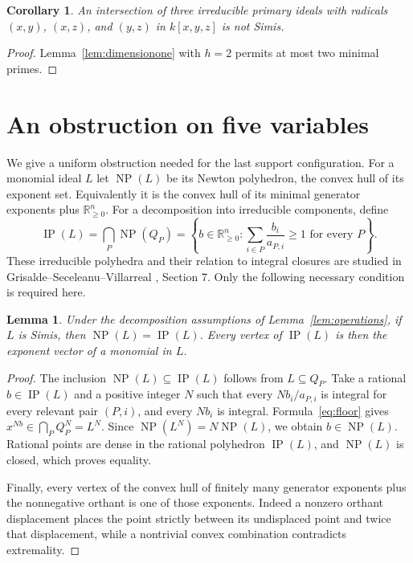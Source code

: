 \documentclass[11pt]{article}
\newtheorem{lemma}[theorem]{Lemma}
\newtheorem{corollary}[theorem]{Corollary}
\newcommand{\NP}{\operatorname{NP}}
\newcommand{\IP}{\operatorname{IP}}
\newcommand{\R}{\mathbb R}
\begin{document}
\begin{corollary}\label{cor:triangle}
An intersection of three irreducible primary ideals with radicals
$(x,y)$, $(x,z)$, and $(y,z)$ in $k[x,y,z]$ is not Simis.
\end{corollary}
\begin{proof}
Lemma~\ref{lem:dimensionone} with $h=2$ permits at most two minimal
primes.
\end{proof}

\section{An obstruction on five variables}
We give a uniform obstruction needed for the last support configuration.
For a monomial ideal $L$ let $\NP(L)$ be its Newton polyhedron,
the convex hull of its exponent set. Equivalently it is the convex
hull of its minimal generator exponents plus $\R_{\geq0}^n$.
For a decomposition into irreducible components, define
\[
 \IP(L)=\bigcap_P\NP(Q_P)
 =\left\{b\in\R_{\geq0}^n:
       \sum_{i\in P}\frac{b_i}{a_{P,i}}\geq1\text{ for every }P\right\}.
\]
These irreducible polyhedra and their relation to integral closures
are studied in Grisalde--Seceleanu--Villarreal \cite{GSV}, Section 7.
Only the following necessary condition is required here.

\begin{lemma}\label{lem:polyhedral}
Under the decomposition assumptions of Lemma~\ref{lem:operations},
if $L$ is Simis, then $\NP(L)=\IP(L)$. Every vertex of $\IP(L)$
is then the exponent vector of a monomial in $L$.
\end{lemma}
\begin{proof}
The inclusion $\NP(L)\subseteq\IP(L)$ follows from $L\subseteq Q_P$.
Take a rational $b\in\IP(L)$ and a positive integer $N$ such that
every $Nb_i/a_{P,i}$ is integral for every relevant pair $(P,i)$,
and every $Nb_i$ is integral. Formula~\eqref{eq:floor} gives
$x^{Nb}\in\bigcap_PQ_P^N=L^N$. Since
$\NP(L^N)=N\NP(L)$, we obtain $b\in\NP(L)$. Rational points are
dense in the rational polyhedron $\IP(L)$, and $\NP(L)$ is closed,
which proves equality.

Finally, every vertex of the convex hull of finitely many generator
exponents plus the nonnegative orthant is one of those exponents.
Indeed a nonzero orthant displacement places the point strictly
between its undisplaced point and twice that displacement, while a
nontrivial convex combination contradicts extremality.
\end{proof}
\end{document}
